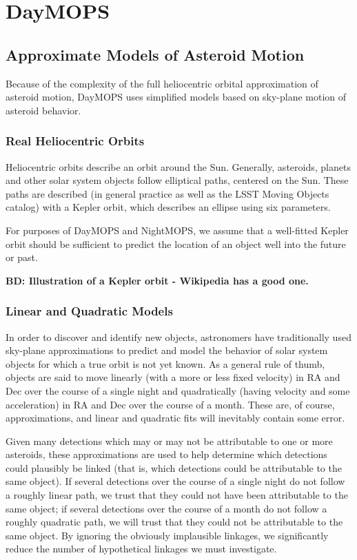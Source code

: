 \section{DayMOPS}
\label{linking}

\subsection{Approximate Models of Asteroid Motion}
Because of the complexity of the full heliocentric orbital
approximation of asteroid motion, DayMOPS uses simplified models based
on sky-plane motion of asteroid behavior.  


\subsubsection{Real Heliocentric Orbits}
Heliocentric orbits describe an orbit around the Sun.  Generally,
asteroids, planets and other solar system objects follow elliptical
paths, centered on the Sun.  These paths are described (in general
practice as well as the LSST Moving Objects catalog) with a Kepler
orbit, which describes an ellipse using six parameters. 

For purposes of DayMOPS and NightMOPS, we assume that a well-fitted
Kepler orbit should be sufficient to predict the location of an object
well into the future or past.  

\textbf{BD: Illustration of a Kepler orbit - Wikipedia has a good one.}



\subsubsection{Linear and Quadratic Models}
In order to discover and identify new objects, astronomers have
traditionally used sky-plane approximations to predict and model the
behavior of solar system objects for which a true orbit is not yet
known.  As a general rule of thumb, objects are said to move linearly
(with a more or less fixed velocity) in RA and Dec over the course of
a single night and quadratically (having velocity and some
acceleration) in RA and Dec over the course of a month.  These are, of
course, approximations, and linear and quadratic fits will inevitably
contain some error.

Given many detections which may or may not be attributable to one or
more asteroids, these approximations are used to help determine which
detections could plausibly be linked (that is, which detections could
be attributable to the same object).  If several detections over the
course of a single night do not follow a roughly linear path, we trust
that they could not have been attributable to the same object; if
several detections over the course of a month do not follow a roughly
quadratic path, we will trust that they could not be attributable to
the same object.  By ignoring the obviously implausible linkages, we
significantly reduce the number of hypothetical linkages we must
investigate.

